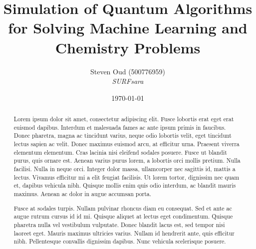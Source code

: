 \documentclass[a4paper,11pt]{article}
\title{Simulation of Quantum Algorithms for Solving Machine Learning and Chemistry Problems}
\author{Steven Oud (500776959) \\ \emph{SURFsara}}
\date{\today}
\begin{document}
\maketitle

\begin{abstract}
Lorem ipsum dolor sit amet, consectetur adipiscing elit. Fusce lobortis erat eget erat euismod dapibus. Interdum et malesuada fames ac ante ipsum primis in faucibus. Donec pharetra, magna ac tincidunt varius, neque odio lobortis velit, eget tincidunt lectus sapien ac velit. Donec maximus euismod arcu, at efficitur urna. Praesent viverra elementum elementum. Cras lacinia nisi eleifend sodales posuere. Fusce ut blandit purus, quis ornare est. Aenean varius purus lorem, a lobortis orci mollis pretium. Nulla facilisi. Nulla in neque orci. Integer dolor massa, ullamcorper nec sagittis id, mattis a lectus. Vivamus efficitur mi a elit feugiat facilisis. Ut lorem tortor, dignissim nec quam et, dapibus vehicula nibh. Quisque mollis enim quis odio interdum, ac blandit mauris maximus. Aenean ac dolor in augue accumsan porta.

Fusce at sodales turpis. Nullam pulvinar rhoncus diam eu consequat. Sed et ante ac augue rutrum cursus id id mi. Quisque aliquet at lectus eget condimentum. Quisque pharetra nulla vel vestibulum vulputate. Donec blandit lacus est, sed tempor nisi laoreet eget. Mauris maximus ultricies varius. Nullam id hendrerit ante, quis efficitur nibh. Pellentesque convallis dignissim dapibus. Nunc vehicula scelerisque posuere.
\end{abstract}
\end{document}
